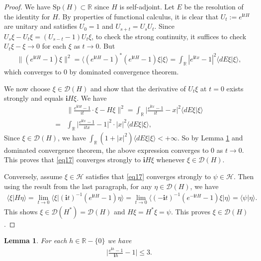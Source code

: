 \documentclass[12pt,a4paper,notitlepage]{article}
\theoremstyle{definition}
\theoremstyle{plain}
\newtheorem{lm}[df]{Lemma}
\newcommand{\mc}{\mathcal}
\newcommand{\Dom}{\scr D}
\newcommand{\bk}[1]{\langle {#1}\rangle}
\newcommand{\scr}{\mathscr}
\newcommand{\im}{\mathbf{i}}
\newcommand{\Rbb}{\mathbb R}
\newcommand{\Sp}{\mathrm{Sp}}
\numberwithin{equation}{section}
\begin{document}
\begin{proof}
We have $\Sp(H)\subset\Rbb$ since $H$ is self-adjoint. Let $E$ be the resolution of the identity for $H$. By properties of functional calculus, it is clear that $U_t:=e^{\im tH}$ are unitary and satisfies $U_0=1$ and $U_{s+t}=U_sU_t$. Since $U_s\xi-U_t\xi=(U_{s-t}-1)U_t\xi$, to check the strong continuity, it suffices to check $U_t\xi-\xi\rightarrow 0$ for each $\xi$ as $t\rightarrow 0$. But
\begin{align*}
\lVert (e^{\im tH}-1)\xi\lVert^2=\bk{(e^{\im tH}-1)^*(e^{\im tH}-1)\xi|\xi}=\int_\Rbb |e^{\im tx}-1|^2\bk{dE\xi|\xi},
\end{align*}
which converges to $0$ by dominated convergence theorem.

We now choose $\xi\in\Dom(H)$ and show that the derivative of $U_t\xi$ at $t=0$ exists strongly and equals $\im H\xi$. We have
\begin{align}
&\Big\lVert \frac{e^{\im tH}-1}{it}\cdot \xi-H\xi  \Big\lVert^2=\int_\Rbb \Big|\frac{e^{\im tx}-1}{it}-x  \Big|^2\bk{dE\xi|\xi}\nonumber\\
=&	\int_\Rbb \Big|\frac{e^{\im tx}-1}{itx}-1  \Big|^2\cdot |x|^2\bk{dE\xi|\xi},\nonumber
\end{align}
Since $\xi\in\Dom(H)$, we have $\int_\Rbb (1+|x|^2)\bk{dE\xi|\xi}<+\infty$. So by Lemma \ref{lb51} and dominated convergence theorem, the above expression converges to $0$ as $t\rightarrow 0$. This proves that \eqref{eq17} converges strongly to $\im H\xi$ whenever $\xi\in\Dom(H)$.

Conversely, assume $\xi\in\mc H$ satisfies that \eqref{eq17} converges strongly to $\psi\in\mc H$. Then using the result from the last paragraph, for any $\eta\in\Dom(H)$, we have
\begin{align}
\bk{\xi|H\eta}=\lim_{t\rightarrow 0}\bk{\xi|(\im t)^{-1}(e^{\im tH}-1)\eta}=\lim_{t\rightarrow 0}\bk{(-\im t)^{-1}(e^{-\im tH}-1)\xi|\eta}=\bk{\psi|\eta}.	\label{eq18}
\end{align}
This shows $\xi\in\Dom(H^*)=\Dom(H)$ and $H\xi=H^*\xi=\psi$. This proves $\xi\in\Dom(H)$.
\end{proof}





\begin{lm}\label{lb51}
For each $h\in\Rbb-\{0\}$ we have
\begin{align*}
\Big|\frac{e^{\im h}-1}{\im h}-1\Big|\leq 3.	
\end{align*}
\end{lm}
\end{document}
